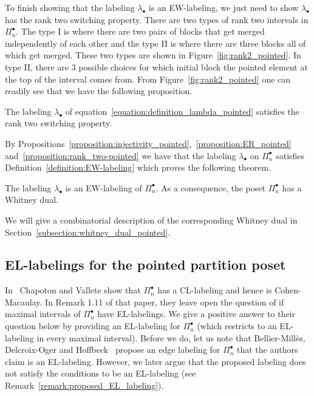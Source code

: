 To finish showing that the labeling $\lambda_{\bullet}$ is an EW-labeling, we just need to show $\lambda_\bullet$ has the rank two switching property. There are two types of rank two intervals in $\Pi_n^\bullet$.   The type I is where there are two pairs of blocks that get merged independently of each other and the type II is where there are three blocks all of which get merged. These two types are shown in Figure~\ref{fig:rank2_pointed}. In type II, there are 3 possible choices for which initial block the pointed element at the top of the interval comes from.  From Figure~\ref{fig:rank2_pointed} one can readily see that we have the following proposition. 

\begin{prop}\label{proposition:rank_two-pointed}
The labeling $\lambda_{\bullet}$ of equation~\eqref{equation:definition_lambda_pointed} satisfies the rank two switching property.
\end{prop}


By Propositions~\ref{proposition:injectivity_pointed},~\ref{proposition:ER_pointed} and~\ref{proposition:rank_two-pointed} we have that the labeling $\lambda_{\bullet}$ on $\Pi_n^{\bullet}$ satisfies Definition~\ref{definition:EW-labeling} which proves the following theorem.

\begin{theo}\label{theorem:EW-pointed}
The labeling $\lambda_{\bullet}$ is an EW-labeling of $\Pi_{n}^{\bullet}$. As a consequence, the poset $\Pi_{n}^{\bullet}$ has a Whitney dual.
\end{theo}


We will give a combinatorial description of the corresponding Whitney dual in Section~\ref{subsection:whitney_dual_pointed}.



\subsection{EL-labelings for the pointed partition poset}\label{section:El-labeling_pointed_partition}

In~\cite[Theorem 1.11]{ChapotonVallete2006} Chapoton and Vallete show that $\Pi_n^\bullet$ has a CL-labeling and hence is Cohen-Macaulay.   In Remark 1.11 of that paper, they  leave open the question of if  maximal intervals of $\Pi_n^\bullet$  have  EL-labelings.    We give a positive answer to their question below by providing an EL-labeling for $\Pi_n^\bullet$ (which restricts to an EL-labeling in every maximal interval). Before we do, let us note that Bellier-Mill{\`e}s, Delcroix-Oger and Hoffbeck~\cite[Proposition 3.13]{BelliermillesDelcroixogerHoffbeck2021} propose an edge labeling for $\Pi_n^{\bullet}$ that the authors claim is an EL-labeling. However, we later argue that the proposed labeling does not satisfy the conditions to be an EL-labeling (see Remark~\ref{remark:proposed_EL_labeling}). 

